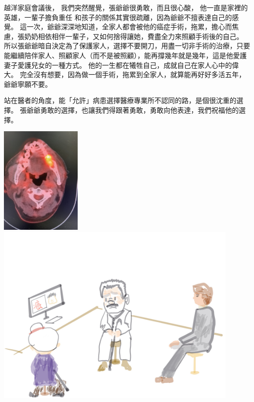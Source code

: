\documentclass[12pt, a4paper]{article}
\begin{document}
越洋家庭會議後，
我們突然醒覺，張爺爺很勇敢，而且很心酸，
他一直是家裡的英雄，一輩子擔負重任
和孩子的關係其實很疏離，因為爺爺不擅表達自己的感覺。
這一次，爺爺深深地知道，全家人都會被他的癌症手術，拖累，擔心而焦慮，張奶奶相依相伴一輩子，又如何捨得讓她，費盡全力來照顧手術後的自己。
所以張爺爺暗自決定為了保護家人，選擇不要開刀，用盡一切非手術的治療，只要能繼續陪伴家人、照顧家人（而不是被照顧），能再撐幾年就是幾年，這是他愛護妻子愛護兒女的一種方式。
他的一生都在犧牲自己，成就自己在家人心中的偉大。
完全沒有想要，因為做一個手術，拖累到全家人，就算能再好好多活五年，爺爺寧願不要。


站在醫者的角度，能「允許」病患選擇醫療專業所不認同的路，是個很沈重的選擇。
張爺爺勇敢的選擇，也讓我們得跟著勇敢，勇敢向他表達，我們祝福他的選擇。

\includegraphics[width=4cm]{IMG_5873_PET_CT_scan_20210816.JPG}
\includegraphics[width=12cm]{family_meeting鄭爺爺.JPG}
\end{document}
